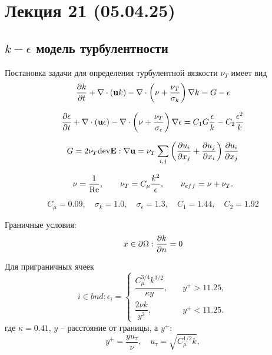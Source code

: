 \section{Лекция 21 (05.04.25)}

\subsection{$k-\epsilon$ модель турбулентности}

Постановка задачи для определения турбулентной вязкости $\nu_T$ имеет вид
\begin{equation}
\frac{\partial k}{\partial t} + \nabla\cdot(\boldsymbol{\rm u} k) - \nabla \cdot \left(\nu + \frac{\nu_T}{\sigma_k}\right)\nabla k = G - \epsilon
\end{equation}

\begin{equation}
\frac{\partial \epsilon}{\partial t} + \nabla\cdot(\boldsymbol{\rm u} \epsilon) - \nabla \cdot \left(\nu + \frac{\nu_T}{\sigma_\epsilon}\right)\nabla \epsilon = 
	C_1 G \frac{\epsilon}{k} - C_2 \frac{\epsilon^2}{k}
\end{equation}

\begin{equation}
G = 2 \nu_T {\rm dev} \boldsymbol{\rm E} : \nabla\boldsymbol{\rm u} = \nu_T \sum_{i,j}\left(\frac{\partial u_i}{\partial x_j} + \frac{\partial u_j}{\partial x_i}\right)\frac{\partial u_i}{\partial x_j}
\end{equation}

\begin{equation}
\nu = \frac{1}{\mathrm{Re}}, \qquad \nu_T = C_\mu\frac{k^2}{\epsilon}, \qquad \nu_{eff} = \nu + \nu_T.
\end{equation}

\begin{equation*}
C_\mu = 0.09, \quad \sigma_k = 1.0, \quad \sigma_\epsilon = 1.3, \quad C_1 = 1.44, \quad C_2 = 1.92
\end{equation*}

Граничные условия:
\begin{equation}
x\in\partial\Omega: \frac{\partial k}{\partial n} = 0
\end{equation}

Для приграничных ячеек
\begin{equation}
i \in bnd: \epsilon_i = \begin{cases}
\dfrac{C_\mu^{3/4} k^{3/2}}{\kappa y}, &\quad y^+ > 11.25, \\[10pt]
\dfrac{2 \nu k}{y^2},                   &\quad y^+ < 11.25.
\end{cases}
\end{equation}
где $\kappa=0.41$, $y$ -- расстояние от границы, а $y^+$:
\begin{equation*}
y^+ = \frac{y u_\tau}{\nu}, \quad u_\tau = \sqrt{C_\mu^{1/2}k},
\end{equation*}

